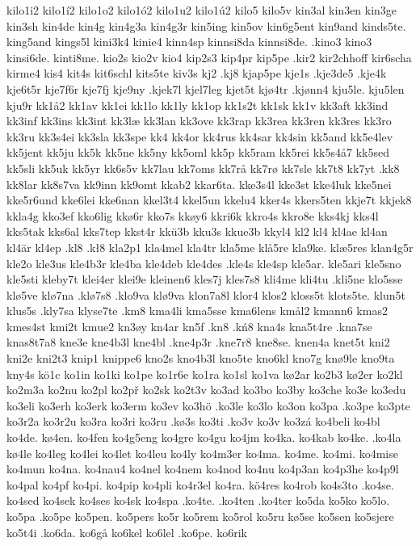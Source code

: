{{kilo1i2
kilo1í2
kilo1o2
kilo1ó2
kilo1u2
kilo1ú2
kilo5
kilo5v
kin3al
kin3en
kin3ge
kin3sh
kin4de
kin4g
kin4g3a
kin4g3r
kin5ing
kin5ov
kin6g5ent
kin9and
kinds5te.
king5and
kings5l
kini3k4
kinie4
kinn4sp
kinnsi8da
kinnsi8de.
.kino3
kino3
kinsi6de.
kinti8me.
kio2s
kio2v
kio4
kip2s3
kip4pr
kip5pe
.kir2
kir2chhoff
kir6scha
kirme4
kis4
kit4s
kit6schl
kits5te
kiv3s
kj2
.kj8
kjap5pe
kje1s
.kje3de5
.kje4k
kje6t5r
kje7f6r
kje7fj
kje9ny
.kjek7l
kjel7leg
kjet5t
kjø4tr
.kjønn4
kju5le.
kju5len
kju9r
kk1å2
kk1av
kk1ei
kk1lo
kk1ly
kk1op
kk1s2t
kk1sk
kk1v
kk3aft
kk3ind
kk3inf
kk3ins
kk3int
kk3læ
kk3lan
kk3ove
kk3rap
kk3rea
kk3ren
kk3res
kk3ro
kk3ru
kk3s4ei
kk3sla
kk3spe
kk4
kk4or
kk4rus
kk4sar
kk4sin
kk5and
kk5e4lev
kk5jent
kk5ju
kk5k
kk5ne
kk5ny
kk5oml
kk5p
kk5ram
kk5rei
kk5s4å7
kk5sed
kk5sli
kk5uk
kk5yr
kk6s5v
kk7lau
kk7oms
kk7rå
kk7rø
kk7sle
kk7t8
kk7yt
.kk8
kk8lar
kk8s7va
kk9inn
kk9omt
kkab2
kkar6ta.
kke3s4l
kke3st
kke4luk
kke5nei
kke5r6und
kke6lei
kke6nan
kkel3t4
kkel5un
kkelu4
kker4s
kkers5ten
kkje7t
kkjek8
kkla4g
kko3ef
kko6lig
kkø6r
kko7s
kkøy6
kkri6k
kkro4s
kkro8e
kks4kj
kks4l
kks5tak
kks6al
kks7tep
kkst4r
kkü3b
kku3s
kkue3b
kkyl4
kl2
kl4
kl4ae
kl4an
kl4är
kl4ep
.kl8
.kł8
kla2p1
kla4mel
kla4tr
kla5me
klå5re
kla9ke.
klæ5res
klan4g5r
kle2o
kle3us
kle4b3r
kle4ba
kle4deb
kle4des
.kle4s
kle4sp
kle5ar.
kle5ari
kle5sno
kle5sti
kleby7t
klei4er
klei9e
kleinen6
kles7j
kles7s8
kli4me
kli4tu
.kli5ne
klo5sse
klø5ve
klø7na
.klø7s8
.klo9va
klø9va
klon7a8l
klor4
klos2
kloss5t
klots5te.
klun5t
klus5s
.kly7sa
klyse7te
.km8
kma4li
kma5sse
kma6lens
kmål2
kmann6
kmas2
kmes4st
kmi2t
kmue2
kn3øy
kn4ar
kn5f
.kn8
.kń8
kna4s
kna5t4re
.kna7se
knas8t7a8
kne3e
kne4b3l
kne4bl
.kne4p3r
.kne7r8
kne8se.
knen4a
knet5t
kni2
kni2e
kni2t3
knip1
knippe6
kno2s
kno4b3l
kno5te
kno6kl
kno7g
knø9le
kno9ta
kny4s
kö1c
ko1in
ko1ki
ko1pe
ko1r6e
ko1ra
ko1sl
ko1va
kø2ar
ko2b3
kø2er
ko2kl
ko2m3a
ko2nu
ko2pl
ko2př
ko2sk
ko2t3v
ko3ad
ko3bo
ko3by
ko3che
ko3e
ko3edu
ko3eli
ko3erh
ko3erk
ko3erm
ko3ev
ko3hö
.ko3le
ko3lo
ko3on
ko3pa
.ko3pe
ko3pte
ko3r2a
ko3r2u
ko3ra
ko3ri
ko3ru
.kø3s
ko3ti
.ko3v
ko3v
ko3zá
ko4beli
ko4bl
ko4de.
kø4en.
ko4fen
ko4g5eng
ko4gre
ko4gu
ko4jm
ko4ka.
ko4kab
ko4ke.
.ko4la
kø4le
ko4leg
ko4lei
ko4let
ko4leu
ko4ly
ko4m3er
ko4ma.
ko4me.
ko4mi.
ko4mise
ko4mun
ko4na.
ko4nau4
ko4nel
ko4nem
ko4nod
ko4nu
ko4p3an
ko4p3he
ko4p9l
ko4pal
ko4pf
ko4pi.
ko4pip
ko4pli
ko4r3el
ko4ra.
kö4res
ko4rob
ko4s3to
.ko4se.
ko4sed
ko4sek
ko4ses
ko4sk
ko4spa
.ko4te.
.ko4ten
.ko4ter
ko5da
ko5ko
ko5lo.
ko5pa
.ko5pe
ko5pen.
ko5pers
ko5r
ko5rem
ko5rol
ko5ru
kø5se
ko5sen
ko5sjere
ko5t4i
.ko6da.
ko6gå
ko6kel
ko6lel
.ko6pe.
ko6rik
}}
